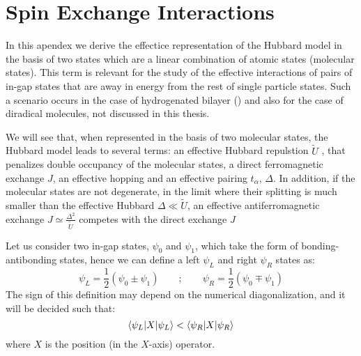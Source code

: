 \chapter{Spin Exchange Interactions} %
In this apendex we derive the effectice representation of the Hubbard model in the basis of two states which are a linear combination of atomic states (molecular states). %
This term is relevant for the study of the effective interactions of pairs of in-gap states that are away in energy from the rest of single particle states. Such a scenario occurs in the case of hydrogenated bilayer () and also for the case of diradical molecules, not discussed in this thesis.\cite{Ortiz2019}

We will see that, when represented in the basis of two molecular states, the Hubbard model leads to several terms: an effective Hubbard repulstion $\tilde{U}$ , that penalizes double occupancy of the molecular states, a direct ferromagnetic exchange $J$, an effective hopping and an effective pairing $t_\alpha$, $\Delta$.
In addition, if the molecular states are not degenerate, %
in the limit where their splitting is much smaller than the effective Hubbard $\Delta\ll\tilde{U}$, an effective antiferromagnetic exchange $J\simeq \frac{\Delta^2}{\tilde U}$ competes with the direct exchange $J$ 


Let us consider two in-gap states, $\psi_0$ and $\psi_1$, which take the form of bonding-antibonding states, hence we can define a left $\psi_L$ and right $\psi_R$ states as:
\begin{equation}
  \psi_L = \frac{1}{2}\left(\psi_0 \pm \psi_1\right) \quad\quad;\quad\quad
  \psi_R = \frac{1}{2}\left(\psi_0 \mp \psi_1\right)
\end{equation}
The sign of this definition may depend on the numerical diagonalization, and it will be decided such that:
\begin{equation*}
  \langle\psi_L|X|\psi_L\rangle < \langle\psi_R|X|\psi_R\rangle
\end{equation*}
where $X$ is the position (in the $X$-axis) operator.




